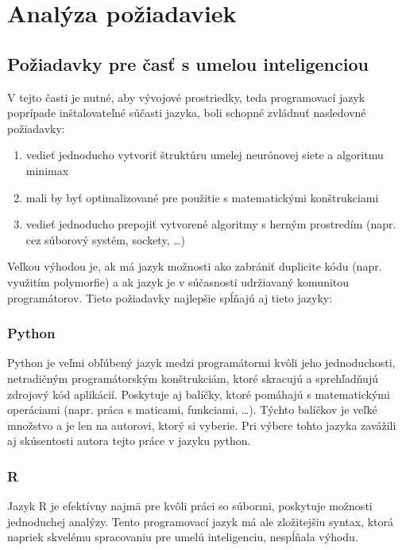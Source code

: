 \section{Analýza požiadaviek}\label{sec:requirements}

\subsection{Požiadavky pre časť s umelou inteligenciou}\label{subsec:requirements-ai}

V tejto časti je nutné, aby vývojové prostriedky, teda programovací jazyk poprípade inštalovateľné súčasti jazyka, boli
schopné zvládnuť nasledovné požiadavky:
\begin{enumerate}
    \item vedieť jednoducho vytvoriť štruktúru umelej neurónovej siete a algoritmu minimax
    \item mali by byť optimalizované pre použitie s matematickými konštrukciami
    \item vedieť jednoducho prepojiť vytvorené algoritmy s herným prostredím (napr. cez súborový systém, sockety, \ldots)
\end{enumerate}
Veľkou výhodou je, ak má jazyk možnosti ako zabrániť duplicite kódu (napr. využitím polymorfie) a ak jazyk je v
súčasnosti udržiavaný komunitou programátorov.
Tieto požiadavky najlepšie spĺňajú\cite{best_ai_languages} aj tieto jazyky:

\subsubsection{Python}
Python je veľmi obľúbený jazyk medzi programátormi kvôli jeho jednoduchosti, netradičným programátorským
konštrukciám, ktoré skracujú a sprehľadňujú zdrojový kód aplikácií.
Poskytuje aj balíčky, ktoré pomáhajú s matematickými operáciami (napr. práca s maticami, funkciami, \dots).
Týchto balíčkov je veľké množstvo a je len na autorovi, ktorý si vyberie.
Pri výbere tohto jazyka zavážili aj skúsentosti autora tejto práce v jazyku python.

\subsubsection{R}

Jazyk R je efektívny najmä pre kvôli práci so súbormi, poskytuje možnosti jednoduchej analýzy.
Tento programovací jazyk má ale zložitejšiu syntax, ktorá napriek skvelému spracovaniu pre umelú inteligenciu,
nespĺňala výhodu.

